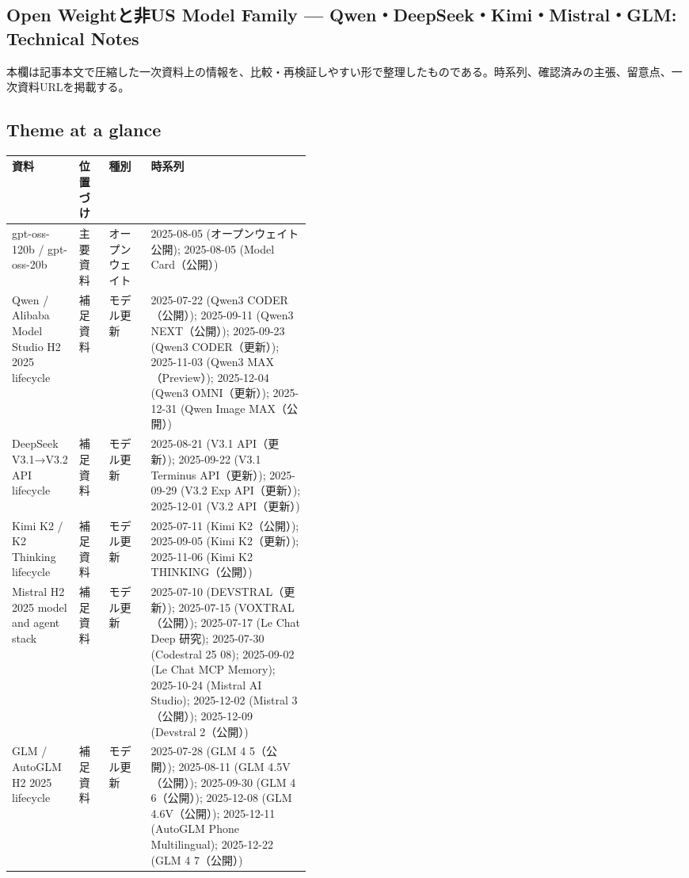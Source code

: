 \subsection*{Open Weightと非US Model Family — Qwen・DeepSeek・Kimi・Mistral・GLM: Technical Notes}
本欄は記事本文で圧縮した一次資料上の情報を、比較・再検証しやすい形で整理したものである。時系列、確認済みの主張、留意点、一次資料URLを掲載する。
\medskip
\subsection*{Theme at a glance}
\begin{center}
\footnotesize
\begin{tabularx}{\linewidth}{@{}p{0.20\linewidth}p{0.10\linewidth}p{0.14\linewidth}X@{}}
\toprule
資料 & 位置づけ & 種別 & 時系列 \\
\midrule
gpt-oss-120b / gpt-oss-20b & 主要資料 & オープンウェイト & 2025-08-05 (オープンウェイト公開); 2025-08-05 (Model Card（公開）)    \\
Qwen / Alibaba Model Studio H2 2025 lifecycle & 補足資料 & モデル更新 & 2025-07-22 (Qwen3 CODER（公開）); 2025-09-11 (Qwen3 NEXT（公開）); 2025-09-23 (Qwen3 CODER（更新）); 2025-11-03 (Qwen3 MAX（Preview）); 2025-12-04 (Qwen3 OMNI（更新）); 2025-12-31 (Qwen Image MAX（公開）)    \\
DeepSeek V3.1→V3.2 API lifecycle & 補足資料 & モデル更新 & 2025-08-21 (V3.1 API（更新）); 2025-09-22 (V3.1 Terminus API（更新）); 2025-09-29 (V3.2 Exp API（更新）); 2025-12-01 (V3.2 API（更新）)    \\
Kimi K2 / K2 Thinking lifecycle & 補足資料 & モデル更新 & 2025-07-11 (Kimi K2（公開）); 2025-09-05 (Kimi K2（更新）); 2025-11-06 (Kimi K2 THINKING（公開）)    \\
Mistral H2 2025 model and agent stack & 補足資料 & モデル更新 & 2025-07-10 (DEVSTRAL（更新）); 2025-07-15 (VOXTRAL（公開）); 2025-07-17 (Le Chat Deep 研究); 2025-07-30 (Codestral 25 08); 2025-09-02 (Le Chat MCP Memory); 2025-10-24 (Mistral AI Studio); 2025-12-02 (Mistral 3（公開）); 2025-12-09 (Devstral 2（公開）)    \\
GLM / AutoGLM H2 2025 lifecycle & 補足資料 & モデル更新 & 2025-07-28 (GLM 4 5（公開）); 2025-08-11 (GLM 4.5V（公開）); 2025-09-30 (GLM 4 6（公開）); 2025-12-08 (GLM 4.6V（公開）); 2025-12-11 (AutoGLM Phone Multilingual); 2025-12-22 (GLM 4 7（公開）)    \\
\bottomrule
\end{tabularx}
\end{center}
\normalsize

